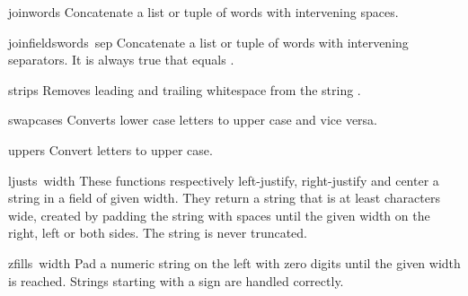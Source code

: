 \begin{funcdesc}{join}{words}
Concatenate a list or tuple of words with intervening spaces.
\end{funcdesc}

\begin{funcdesc}{joinfields}{words\, sep}
Concatenate a list or tuple of words with intervening separators.
It is always true that
equals .
\end{funcdesc}

\begin{funcdesc}{strip}{s}
Removes leading and trailing whitespace from the string
.
\end{funcdesc}

\begin{funcdesc}{swapcase}{s}
Converts lower case letters to upper case and vice versa.
\end{funcdesc}

\begin{funcdesc}{upper}{s}
Convert letters to upper case.
\end{funcdesc}

\begin{funcdesc}{ljust}{s\, width}
These functions respectively left-justify, right-justify and center a
string in a field of given width.
They return a string that is at least
characters wide, created by padding the string
with spaces until the given width on the right, left or both sides.
The string is never truncated.
\end{funcdesc}

\begin{funcdesc}{zfill}{s\, width}
Pad a numeric string on the left with zero digits until the given
width is reached.  Strings starting with a sign are handled correctly.
\end{funcdesc}
